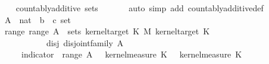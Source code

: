 \begin{isabellebody}
\ \ \isamarkupfalse%
\ {\isachardoublequoteopen}countably{\isacharunderscore}{\kern0pt}additive\ {\isacharparenleft}{\kern0pt}sets\ {\isacharquery}{\kern0pt}{\isasymOmega}\ {\isacharparenleft}{\kern0pt}{\isacharquery}{\kern0pt}{\isasymkappa}\ {\isasymomega}\isanewline
\ \ \isamarkupfalse%
\ {\isacharparenleft}{\kern0pt}auto\ simp\ add{\isacharcolon}{\kern0pt}\ countably{\isacharunderscore}{\kern0pt}additive{\isacharunderscore}{\kern0pt}def{\isacharparenright}{\kern0pt}\isanewline
\ \ \ \ \isamarkupfalse%
\ A\ {\isacharcolon}{\kern0pt}{\isacharcolon}{\kern0pt}\ {\isachardoublequoteopen}nat\ {\isasymRightarrow}\ {\isacharparenleft}{\kern0pt}{\isacharprime}{\kern0pt}b\ {\isasymtimes}\ {\isacharprime}{\kern0pt}c{\isacharparenright}{\kern0pt}\ set{\isachardoublequoteclose}\isanewline
\ \ \ \ \isamarkupfalse%
\ range{\isacharcolon}{\kern0pt}\ {\isachardoublequoteopen}range\ A\ {\isasymsubseteq}\ sets\ {\isacharparenleft}{\kern0pt}kernel{\isacharunderscore}{\kern0pt}target\ K{\isacharunderscore}{\kern0pt}{}\ {\isasymOtimes}\isactrlsub M\ kernel{\isacharunderscore}{\kern0pt}target\ K{\isacharunderscore}{\kern0pt}{}{\isacharparenright}{\kern0pt}{\isachardoublequoteclose}\isanewline
\ \ \ \ \ \ \ \ \ \ \ disj{\isacharcolon}{\kern0pt}\ {\isachardoublequoteopen}disjoint{\isacharunderscore}{\kern0pt}family\ A{\isachardoublequoteclose}\isanewline
\ \ \ \ \isamarkupfalse%
\ {\isachardoublequoteopen}{\isacharparenleft}{\kern0pt}{\isasymintegral}\isactrlsup {\isacharplus}{\kern0pt}\ {\isasymomega}\ {\isasymintegral}\isactrlsup {\isacharplus}{\kern0pt}\ {\isasymomega}\ indicator\ {\isacharparenleft}{\kern0pt}{\isasymUnion}\ {\isacharparenleft}{\kern0pt}range\ A{\isacharparenright}{\kern0pt}{\isacharparenright}{\kern0pt}\ {\isacharparenleft}{\kern0pt}{\isasymomega}\ {\isasymomega}\ {\isasympartial}kernel{\isacharunderscore}{\kern0pt}measure\ K{\isacharunderscore}{\kern0pt}{}\ {\isacharparenleft}{\kern0pt}{\isasymomega}\ {\isasymomega}\ {\isasympartial}kernel{\isacharunderscore}{\kern0pt}measure\ K{\isacharunderscore}{\kern0pt}{}\ {\isasymomega}\ {\isacharequal}{\kern0pt}\isanewline

\end{isabellebody}

